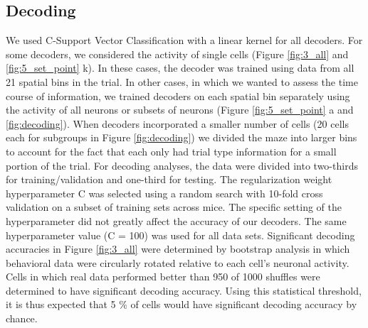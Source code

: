 \subsection{Decoding}\label{methods:decoding}
We used C-Support Vector Classification with a linear kernel for all decoders. For some decoders, we considered the activity of single cells (Figure \ref{fig:3_all} and \ref{fig:5_set_point} k). In these cases, the decoder was trained using data from all 21 spatial bins in the trial. In other cases, in which we wanted to assess the time course of information, we trained decoders on each spatial bin separately using the activity of all neurons or subsets of neurons (Figure \ref{fig:5_set_point} a and \ref{fig:decoding}). When decoders incorporated a smaller number of cells (20 cells each for subgroups in Figure \ref{fig:decoding}) we divided the maze into larger bins to account for the fact that each only had trial type information for a small portion of the trial. For decoding analyses, the data were divided into two-thirds for training/validation and one-third for testing. The regularization weight hyperparameter C was selected using a random search with 10-fold cross validation on a subset of training sets across mice. The specific setting of the hyperparameter did not greatly affect the accuracy of our decoders. The same hyperparameter value (C = 100) was used for all data sets. Significant decoding accuracies in Figure \ref{fig:3_all} were determined by bootstrap analysis in which behavioral data were circularly rotated relative to each cell's neuronal activity. Cells in which real data performed better than 950 of 1000 shuffles were determined to have significant decoding accuracy. Using this statistical threshold, it is thus expected that 5 $\%$  of cells would have significant decoding accuracy by chance.